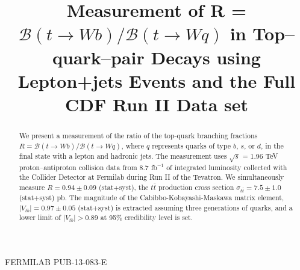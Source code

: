\documentclass[aps,prd,twocolumn,superscriptaddress,showpacs]{revtex4}
\begin{document}

\hfill FERMILAB PUB-13-083-E


\title{Measurement of R = \boldmath${\mathcal{B}\left( t \rightarrow Wb \right)/\mathcal{B}\left(t 
\rightarrow Wq \right)} $ in Top--quark--pair Decays using Lepton+jets Events and the Full CDF Run 
II Data set} 




\begin{abstract}
\noindent
We present a measurement of the ratio of the top-quark 
branching fractions 
$R=\mathcal{B}(t\rightarrow  Wb)/\mathcal{B}(t\rightarrow Wq)$, where $q$ represents quarks of type
 $b$, $s$, or  $d$, 
in the final state with a lepton and hadronic jets. 
The measurement uses $\sqrt{s}$ = 1.96 TeV proton--antiproton collision data from 8.7 fb$^{-1}$ 
of integrated luminosity
collected with the Collider Detector at Fermilab during Run II of the Tevatron. 
We simultaneously measure $R=0.94 \pm 0.09$ (stat+syst), the $t\bar{t}$ production cross section 
$\sigma_{t \bar t} = 7.5 \pm 1.0$ (stat+syst) pb. 
The magnitude of the Cabibbo-Kobayashi-Maskawa  matrix element, 
$\left|V_{tb}\right| = 0.97 \pm 0.05$ (stat+syst) is extracted 
assuming three generations of quarks,
and a lower limit of $|V_{tb}|>0.89$ at 95\% credibility level is set.

\end{abstract}
\end{document}
